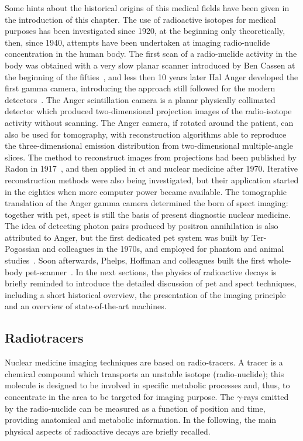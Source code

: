 Some hints about the historical origins of this medical fields have been given in the introduction of this chapter. The use of radioactive isotopes for medical purposes has been investigated since 1920, at the beginning only theoretically, then, since 1940, attempts have been undertaken at imaging radio-nuclide concentration in the human body. The first scan of a radio-nuclide activity in the body was obtained with a very slow planar scanner introduced by Ben Cassen at the beginning of the fifties~\parencite{Blahd1996}, and less then 10 years later Hal Anger developed the first gamma camera, introducing the approach still followed for the modern detectors~\parencite{Anger1958}. The Anger scintillation camera is a planar physically collimated detector which produced two-dimensional projection images of the radio-isotope activity without scanning. The Anger camera, if rotated around the patient, can also be used for tomography, with reconstruction algorithms able to reproduce the three-dimensional emission distribution from two-dimensional multiple-angle slices. The method to reconstruct images from projections had been published by Radon in 1917~\parencite{Radon1917}, and then applied in \gls{ct} and nuclear medicine after 1970. Iterative reconstruction methods were also being investigated, but their application started in the eighties when more computer power became available. The tomographic translation of the Anger gamma camera determined the born of \gls{spect} imaging: together with \gls{pet}, \gls{spect} is still the basis of present diagnostic nuclear medicine. The idea of detecting photon pairs produced by positron annihilation is also attributed to Anger, but the first dedicated \gls{pet} system was built by Ter-Pogossian and colleagues in the 1970s, and employed for phantom and animal studies~\parencite{Ter-Pogossian1975, Ter-Pogossian1983}. Soon afterwards, Phelps, Hoffman and colleagues built the first whole-body \gls{pet}-scanner~\parencite{Hoffmann1976}. 
In the next sections, the physics of radioactive decays is briefly reminded to introduce the detailed discussion of \gls{pet} and \gls{spect} techniques, including a short historical overview, the presentation of the imaging principle and an overview of state-of-the-art machines.
   
\subsection{Radiotracers}\label{chap1::subsec::NMradionuclides}

Nuclear medicine imaging techniques are based on radio-tracers. A tracer is a chemical compound which transports an unstable isotope (radio-nuclide); this molecule is designed to be involved in specific metabolic processes and, thus, to concentrate in the area to be targeted for imaging purpose. The $\gamma$-rays emitted by the radio-nuclide can be measured as a function of position and time, providing anatomical and metabolic information.  In the following, the main physical aspects of radioactive decays are briefly recalled. 

